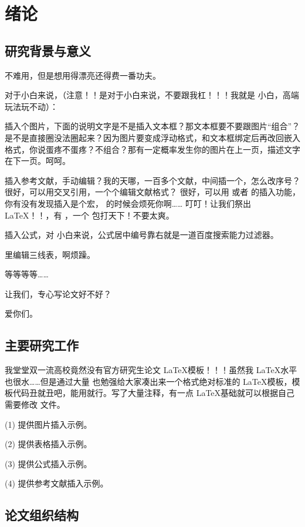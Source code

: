 \section{绪论}
\subsection{研究背景与意义}

 不难用，但是想用得漂亮还得费一番功夫。

对于小白来说，（注意！！是对于小白来说，不要跟我杠！！！我就是  小白，高端玩法玩不动）：

插入个图片，下面的说明文字是不是插入文本框？那文本框要不要跟图片“组合”？是不是直接圈没法圈起来？因为图片要变成浮动格式，和文本框绑定后再改回嵌入格式，你说蛋疼不蛋疼？不组合？那有一定概率发生你的图片在上一页，描述文字在下一页。呵呵。

插入参考文献，手动编辑？我的天哪，一百多个文献，中间插一个，怎么改序号？
很好，可以用交叉引用，一个个编辑文献格式？
很好，可以用  或者  的插入功能，你有没有发现插入是个宏， 的时候会烦死你啊……
叮叮！让我们祭出 \LaTeX！！，有 ，一个  包打天下！不要太爽。

插入公式，对  小白来说，公式居中编号靠右就是一道百度搜索能力过滤器。

 里编辑三线表，啊烦躁。

等等等等……

让我们，专心写论文好不好？

爱你们。


\subsection{主要研究工作}
我堂堂双一流高校竟然没有官方研究生论文 \LaTeX 模板！！！虽然我 \LaTeX 水平也很水……但是通过大量  也勉强给大家凑出来一个格式绝对标准的 \LaTeX 模板，模板代码丑就丑吧，能用就行。写了大量注释，有一点 \LaTeX 基础就可以根据自己需要修改  文件。

(1) 提供图片插入示例。

(2) 提供表格插入示例。

(3) 提供公式插入示例。

(4) 提供参考文献插入示例。

\subsection{论文组织结构}

